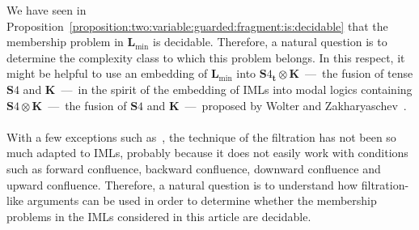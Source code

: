 \documentclass[draft]{article}
\def\PSPACE{\mathbf{PSPACE}}
\def\K{\mathbf{K}}
\def\S{\mathbf{S}}
\def\L{\mathbf{L}}
\begin{document}
%
%
%
%
We have seen in Proposition~\ref{proposition:two:variable:guarded:fragment:is:decidable} that the membership problem in $\L_{\min}$ is decidable.
Therefore, a natural question is to determine the complexity class to which this problem belongs.
In this respect, it might be helpful to use an embedding of $\L_{\min}$ into $\S4_{\mathbf{t}}{\otimes}\K$~---~the fusion of tense $\S4$ and $\K$~---~in the spirit of the embedding of IMLs into modal logics containing $\S4{\otimes}\K$~---~the fusion of $\S4$ and $\K$~---~proposed by Wolter and Zakharyaschev~\cite{Wolter:Zakharyaschev:1997}.
%
%
\\
\\
%
%
With a few exceptions such as~\cite{Hasimoto:2001,Takano:2003}, the technique of the filtration has not been so much adapted to IMLs, probably because it does not easily work with conditions such as forward confluence, backward confluence, downward confluence and upward confluence.
Therefore, a natural question is to understand how filtration-like arguments can be used in order to determine whether the membership problems in the IMLs considered in this article are decidable.
%
%
%
%
\end{document}
